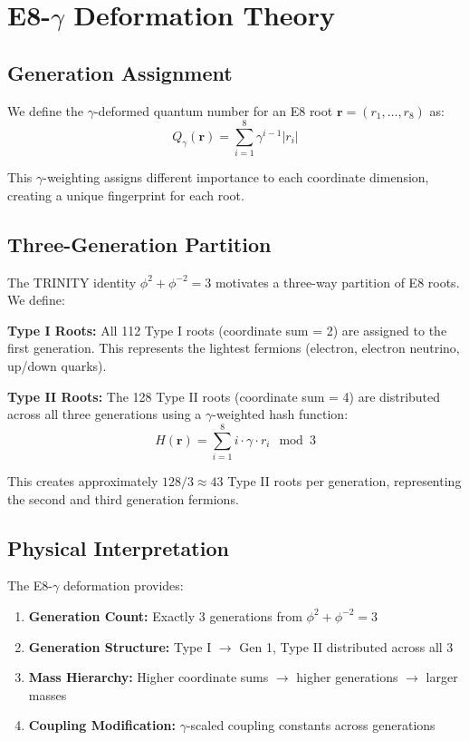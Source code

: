 \documentclass[12pt,a4paper]{article}
\begin{document}
\section{E8-$\gamma$ Deformation Theory}

\subsection{Generation Assignment}

We define the $\gamma$-deformed quantum number for an E8 root $\bm{r} = (r_1, \ldots, r_8)$ as:
\begin{equation}
Q_\gamma(\bm{r}) = \sum_{i=1}^{8} \gamma^{i-1} |r_i|
\end{equation}

This $\gamma$-weighting assigns different importance to each coordinate dimension, creating a unique fingerprint for each root.

\subsection{Three-Generation Partition}

The TRINITY identity $\phi^2 + \phi^{-2} = 3$ motivates a three-way partition of E8 roots. We define:

\textbf{Type I Roots:} All 112 Type I roots (coordinate sum = 2) are assigned to the first generation. This represents the lightest fermions (electron, electron neutrino, up/down quarks).

\textbf{Type II Roots:} The 128 Type II roots (coordinate sum = 4) are distributed across all three generations using a $\gamma$-weighted hash function:
\begin{equation}
H(\bm{r}) = \sum_{i=1}^{8} i \cdot \gamma \cdot r_i \mod 3
\end{equation}

This creates approximately $128/3 \approx 43$ Type II roots per generation, representing the second and third generation fermions.

\subsection{Physical Interpretation}

The E8-$\gamma$ deformation provides:
\begin{enumerate}
\item \textbf{Generation Count:} Exactly 3 generations from $\phi^2 + \phi^{-2} = 3$
\item \textbf{Generation Structure:} Type I $\to$ Gen 1, Type II distributed across all 3
\item \textbf{Mass Hierarchy:} Higher coordinate sums $\to$ higher generations $\to$ larger masses
\item \textbf{Coupling Modification:} $\gamma$-scaled coupling constants across generations
\end{enumerate}
\end{document}
